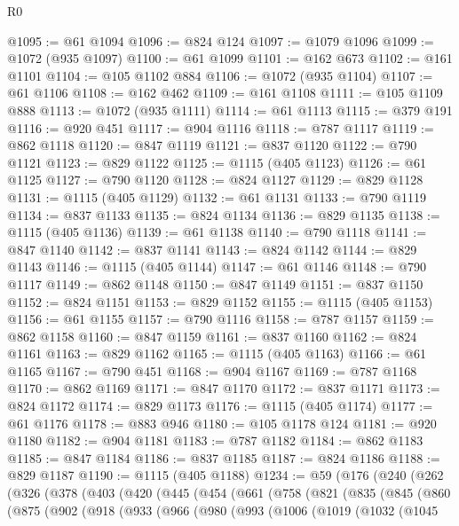 \begin{lexlean}{R0}
\begin{coremodule}
{{{{{{{{{{{{{{{{{{{{{{{{{{{{{{{{{{{{{{{{{{{{{{{{{{{{{{{{{{{{{{{{{{{{{{{{{{{{{{{{{{{{{{@1095 := @61 @1094
@1096 := @824 @124
@1097 := @1079 @1096
@1099 := @1072 (@935 @1097)
@1100 := @61 @1099
@1101 := @162 @673
@1102 := @161 @1101
@1104 := @105 @1102 @884
@1106 := @1072 (@935 @1104)
@1107 := @61 @1106
@1108 := @162 @462
@1109 := @161 @1108
@1111 := @105 @1109 @888
@1113 := @1072 (@935 @1111)
@1114 := @61 @1113
@1115 := @379 @191
@1116 := @920 @451
@1117 := @904 @1116
@1118 := @787 @1117
@1119 := @862 @1118
@1120 := @847 @1119
@1121 := @837 @1120
@1122 := @790 @1121
@1123 := @829 @1122
@1125 := @1115 (@405 @1123)
@1126 := @61 @1125
@1127 := @790 @1120
@1128 := @824 @1127
@1129 := @829 @1128
@1131 := @1115 (@405 @1129)
@1132 := @61 @1131
@1133 := @790 @1119
@1134 := @837 @1133
@1135 := @824 @1134
@1136 := @829 @1135
@1138 := @1115 (@405 @1136)
@1139 := @61 @1138
@1140 := @790 @1118
@1141 := @847 @1140
@1142 := @837 @1141
@1143 := @824 @1142
@1144 := @829 @1143
@1146 := @1115 (@405 @1144)
@1147 := @61 @1146
@1148 := @790 @1117
@1149 := @862 @1148
@1150 := @847 @1149
@1151 := @837 @1150
@1152 := @824 @1151
@1153 := @829 @1152
@1155 := @1115 (@405 @1153)
@1156 := @61 @1155
@1157 := @790 @1116
@1158 := @787 @1157
@1159 := @862 @1158
@1160 := @847 @1159
@1161 := @837 @1160
@1162 := @824 @1161
@1163 := @829 @1162
@1165 := @1115 (@405 @1163)
@1166 := @61 @1165
@1167 := @790 @451
@1168 := @904 @1167
@1169 := @787 @1168
@1170 := @862 @1169
@1171 := @847 @1170
@1172 := @837 @1171
@1173 := @824 @1172
@1174 := @829 @1173
@1176 := @1115 (@405 @1174)
@1177 := @61 @1176
@1178 := @883 @946
@1180 := @105 @1178 @124
@1181 := @920 @1180
@1182 := @904 @1181
@1183 := @787 @1182
@1184 := @862 @1183
@1185 := @847 @1184
@1186 := @837 @1185
@1187 := @824 @1186
@1188 := @829 @1187
@1190 := @1115 (@405 @1188)
@1234 := @59
    (@176
      (@240
        (@262
          (@326
            (@378
              (@403
                (@420
                  (@445
                    (@454
                      (@661
                        (@758
                          (@821
                            (@835
                              (@845
                                (@860
                                  (@875
                                    (@902
                                      (@918
                                        (@933
                                          (@966
                                            (@980
                                              (@993
                                                (@1006
                                                  (@1019
                                                    (@1032
                                                      (@1045
}}}}}}}}}}}}}}}}}}}}}}}}}}}}}}}}}}}}}}}}}}}}}}}}}}}}}}}}}}}}}}}}}}}}}}}}}}}}}}}}}}}}}}
\end{coremodule}
\end{lexlean}

